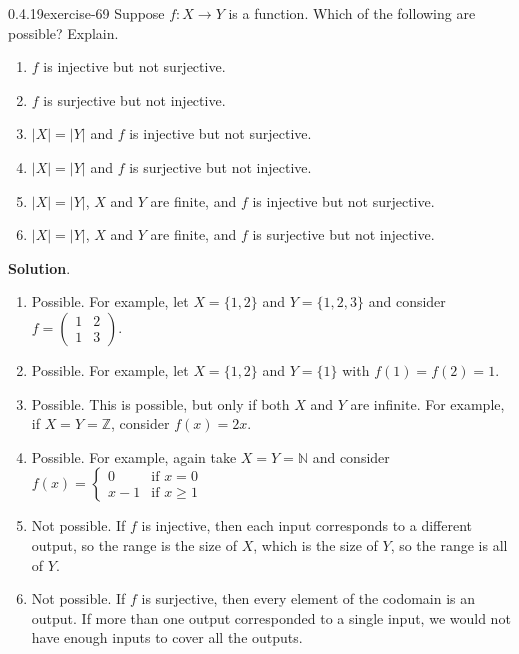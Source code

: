 \documentclass[twoside,11pt,]{book}
\numberwithin{equation}{chapter}
\newcommand{\N}{\mathbb N}
\newcommand{\Z}{\mathbb Z}
\newcommand{\amp}{&}
\begin{document}
\begin{divisionsolution}{0.4.19}{}{exercise-69}%
\hypertarget{p-1116}{}%
Suppose \(f:X \to Y\) is a function. Which of the following are possible? Explain.\leavevmode%
\begin{enumerate}[label=(\alph*)]
\item\hypertarget{li-897}{}\(f\) is injective but not surjective.%
\item\hypertarget{li-898}{}\(f\) is surjective but not injective.%
\item\hypertarget{li-899}{}\(|X| = |Y|\) and \(f\) is injective but not surjective.%
\item\hypertarget{li-900}{}\(|X| = |Y|\) and \(f\) is surjective but not injective.%
\item\hypertarget{li-901}{}\(|X| = |Y|\), \(X\) and \(Y\) are finite, and \(f\) is injective but not surjective.%
\item\hypertarget{li-902}{}\(|X| = |Y|\), \(X\) and \(Y\) are finite, and \(f\) is surjective but not injective.%
\end{enumerate}
%
\par\smallskip%
\noindent\textbf{Solution}.\quad%
\hypertarget{p-1117}{}%
\leavevmode%
\begin{enumerate}[label=(\alph*)]
\item\hypertarget{li-903}{}\hypertarget{p-1118}{}%
Possible. For example, let \(X=\{1,2\}\) and \(Y = \{1,2,3\}\) and consider \(f=\begin{pmatrix}1 \amp 2 \\ 1 \amp 3\end{pmatrix}\).%
\item\hypertarget{li-904}{}\hypertarget{p-1119}{}%
Possible. For example, let \(X = \{1,2\}\) and \(Y = \{1\}\) with \(f(1) = f(2) = 1\).%
\item\hypertarget{li-905}{}\hypertarget{p-1120}{}%
Possible. This is possible, but only if both \(X\) and \(Y\) are infinite. For example, if \(X = Y = \Z\), consider \(f(x) = 2x\).%
\item\hypertarget{li-906}{}\hypertarget{p-1121}{}%
Possible. For example, again take \(X = Y = \N\) and consider \(f(x) = \begin{cases} 0 \amp \text{if } x = 0 \\ x-1 \amp \text{if } x \ge 1\end{cases}\)%
\item\hypertarget{li-907}{}\hypertarget{p-1122}{}%
Not possible. If \(f\) is injective, then each input corresponds to a different output, so the range is the size of \(X\), which is the size of \(Y\), so the range is all of \(Y\).%
\item\hypertarget{li-908}{}\hypertarget{p-1123}{}%
Not possible. If \(f\) is surjective, then every element of the codomain is an output. If more than one output corresponded to a single input, we would not have enough inputs to cover all the outputs.%
\end{enumerate}
%
\end{divisionsolution}%
\end{document}
